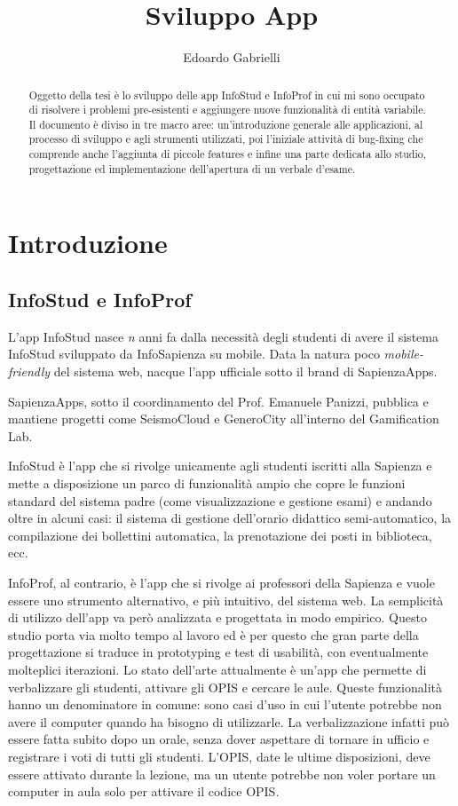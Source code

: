 \documentclass[Lau, oneside]{sapthesis}%
\title{Sviluppo App}
\author{Edoardo Gabrielli}
\begin{document}
\frontmatter
\maketitle
\begin{abstract}
Oggetto della tesi è lo sviluppo delle app InfoStud e InfoProf in cui mi sono occupato di risolvere i problemi pre-esistenti e aggiungere nuove funzionalità di entità variabile.
Il documento è diviso in tre macro aree: un'introduzione generale alle applicazioni, al processo di sviluppo e agli strumenti utilizzati, poi l'iniziale attività di bug-fixing che comprende anche l'aggiunta di piccole features e infine una parte dedicata allo studio, progettazione ed implementazione dell'apertura di un verbale d'esame.
\end{abstract}

\tableofcontents

\mainmatter
\chapter{Introduzione}
\label{ch:1}

\section{InfoStud e InfoProf}
\label{sec:pres}
L'app InfoStud nasce \textit{n} anni fa dalla necessità degli studenti di avere il sistema InfoStud sviluppato da InfoSapienza su mobile.
Data la natura poco \textit{mobile-friendly} del sistema web, nacque l'app ufficiale sotto il brand di SapienzaApps.

SapienzaApps, sotto il coordinamento del Prof. Emanuele Panizzi, pubblica e mantiene progetti come SeismoCloud e GeneroCity all'interno
del Gamification Lab.

InfoStud è l'app che si rivolge unicamente agli studenti iscritti alla Sapienza e mette a disposizione un parco di funzionalità ampio
che copre le funzioni standard del sistema padre (come visualizzazione e gestione esami) e andando oltre in alcuni casi: il sistema
di gestione dell'orario didattico semi-automatico, la compilazione dei bollettini automatica, la prenotazione dei posti in biblioteca, ecc.

InfoProf, al contrario, è l'app che si rivolge ai professori della Sapienza e vuole essere uno strumento alternativo, e più intuitivo, 
del sistema web. La semplicità di utilizzo dell'app va però analizzata e progettata in modo empirico. Questo studio porta via molto tempo 
al lavoro ed è per questo che gran parte della progettazione si traduce in prototyping e test di usabilità, con eventualmente molteplici
iterazioni. Lo stato dell'arte attualmente è un'app che permette di verbalizzare gli studenti, attivare gli OPIS e cercare le aule.
Queste funzionalità hanno un denominatore in comune: sono casi d'uso in cui l'utente potrebbe non avere il computer quando ha bisogno
di utilizzarle. La verbalizzazione infatti può essere fatta subito dopo un orale, senza dover aspettare di tornare in ufficio e 
registrare i voti di tutti gli studenti. L'OPIS, date le ultime disposizioni, deve essere attivato durante la lezione, ma un utente
potrebbe non voler portare un computer in aula solo per attivare il codice OPIS.
\end{document}
